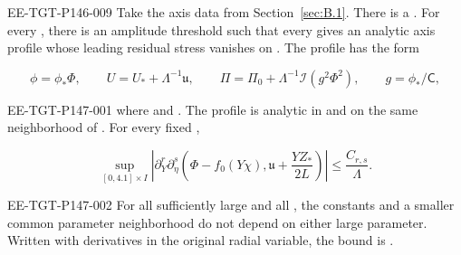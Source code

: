 \begin{proposition}\label{prop:B.2}
\begin{EESegment}{EE-TGT-P146-009}
Take the axis data from Section~\ref{sec:B.1}. There is a
. For every , there is an
amplitude threshold  such that every
 gives an analytic axis profile whose leading
residual stress vanishes on . The profile has the form
\end{EESegment}
\begin{equation}
  \phi=\phi_*\Phi,
  \qquad U=U_*+\Lambda^{-1}\mathfrak u,
  \qquad \Pi=\Pi_0+\Lambda^{-1}\mathcal I(g^2\Phi^2),
  \qquad g=\phi_*/\mathsf C,
  \tag{B.12}\label{eq:B.12}
\end{equation}
%
\begin{EESegment}{EE-TGT-P147-001}
where  and . The
profile is analytic in  and  on the same
neighborhood of . For every fixed
,
\end{EESegment}
\begin{equation}
  \sup_{[0,4.1]\times I}
  \left|\partial_Y^r\partial_\eta^s
    \left(\Phi-f_0(Y\chi),\mathfrak u+\frac{YZ_*}{2L}\right)\right|
  \leq\frac{C_{r,s}}{\Lambda}.
  \tag{B.13}\label{eq:B.13}
\end{equation}
\begin{EESegment}{EE-TGT-P147-002}
For all sufficiently large  and all
, the constants and a smaller common
parameter neighborhood do not depend on either large parameter. Written with derivatives in the
original radial variable, the bound is .
\end{EESegment}
\end{proposition}

